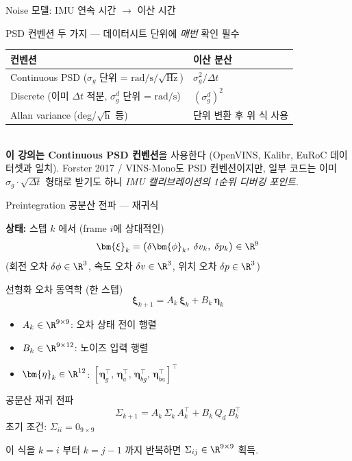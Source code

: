 \begin{frame}[shrink=15]{Noise 모델: IMU 연속 시간 $\to$ 이산 시간}
  \pause
  \begin{alertblock}{\small PSD 컨벤션 두 가지 — 데이터시트 단위에 \emph{매번} 확인 필수}
    \footnotesize
    \begin{tabular}{ll}
      \toprule
      \textbf{컨벤션} & \textbf{이산 분산} \\
      \midrule
      Continuous PSD ($\sigma_g$ 단위 = $\text{rad/s}/\sqrt{\text{Hz}}$) & $\sigma_g^2 / \Delta t$ \\
      Discrete (이미 $\Delta t$ 적분, $\sigma_g^d$ 단위 = $\text{rad/s}$) & $(\sigma_g^d)^2$ \\
      Allan variance (deg/$\sqrt{\text{h}}$ 등) & 단위 변환 후 위 식 사용 \\
      \bottomrule
    \end{tabular}\\[2pt]
    \textbf{이 강의는 Continuous PSD 컨벤션}을 사용한다 (OpenVINS, Kalibr, EuRoC 데이터셋과 일치).
    Forster 2017 / VINS-Mono도 PSD 컨벤션이지만, 일부 코드는 이미 $\sigma_g \cdot \sqrt{\Delta t}$ 형태로 받기도 하니 \emph{IMU 캘리브레이션의 1순위 디버깅 포인트}.
  \end{alertblock}
\end{frame}


\begin{frame}[shrink=20]{Preintegration 공분산 전파 — 재귀식}

  \textbf{상태:} 스텝 $k$ 에서 (frame $i$에 상대적인)
  \[
    \bm{\xi}_k = \bigl(\delta\bm{\phi}_k,\;\delta v_k,\;\delta p_k\bigr) \in \R^9
  \]
  (회전 오차 $\delta\phi \in \R^3$, 속도 오차 $\delta v \in \R^3$, 위치 오차 $\delta p \in \R^3$)

  \pause
  \vspace{0.4em}
  \begin{block}{선형화 오차 동역학 (한 스텝)}
    \[
      \bm{\xi}_{k+1} = A_k\,\bm{\xi}_k + B_k\,\bm{\eta}_k
    \]
    \begin{itemize}
      \item $A_k \in \R^{9\times 9}$: 오차 상태 전이 행렬
      \item $B_k \in \R^{9\times 12}$: 노이즈 입력 행렬
      \item $\bm{\eta}_k \in \R^{12}$: $[\bm{\eta}_g^\top,\,\bm{\eta}_a^\top,\,\bm{\eta}_{bg}^\top,\,\bm{\eta}_{ba}^\top]^\top$
    \end{itemize}
  \end{block}

  \pause
  \begin{alertblock}{공분산 재귀 전파}
    \[
      \boxed{\Sigma_{k+1} = A_k\,\Sigma_k\,A_k^\top + B_k\,Q_d\,B_k^\top}
    \]
    초기 조건: $\Sigma_{ii} = 0_{9\times 9}$
  \end{alertblock}

  \pause
  \vspace{0.2em}
  이 식을 $k = i$ 부터 $k = j-1$ 까지 반복하면 $\Sigma_{ij} \in \R^{9\times 9}$ 획득.
\end{frame}

